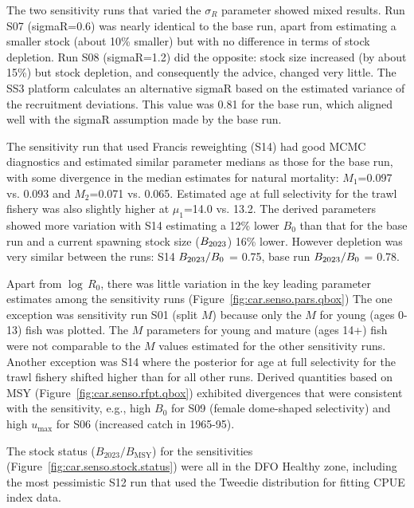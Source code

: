 \documentclass[11pt]{book}
\newcommand{\Bmsy}{B_\text{MSY}}
\newcommand{\pc}{\%}
\begin{document}
The two sensitivity runs that varied the $\sigma_R$ parameter showed mixed results.
Run S07 (sigmaR=0.6) was nearly identical to the base run, apart from estimating a smaller stock (about 10\pc{} smaller) but with no difference in terms of stock depletion.
Run S08 (sigmaR=1.2) did the opposite: stock size increased (by about 15\pc{}) but stock depletion, and consequently the advice, changed very little.
The SS3 platform calculates an alternative sigmaR based on the estimated variance of the recruitment deviations. 
This value was 0.81 for the base run, which aligned well with the sigmaR assumption made by the base run.

The sensitivity run that used Francis reweighting (S14) had good MCMC diagnostics and estimated similar parameter medians as those for the base run, with some divergence in the median estimates for natural mortality: $M_1$=0.097 vs. 0.093 and $M_2$=0.071 vs. 0.065. 
Estimated age at full selectivity for the trawl fishery was also slightly higher at $\mu_1$=14.0 vs. 13.2.
The derived parameters showed more variation with S14 estimating a 12\pc{} lower $B_0$ than that for the base run and a current spawning stock size ($B_{2023}$) 16\pc{} lower. 
However depletion was very similar between the runs: S14 $B_{2023}/B_0$ = 0.75, base run $B_{2023}/B_0$ = 0.78.

Apart from $\log\,R_0$, there was little variation in the key leading parameter estimates among the  sensitivity runs (Figure~\ref{fig:car.senso.pars.qbox})
The one exception was sensitivity run S01 (split $M$) because only the $M$ for young (ages 0-13) fish was plotted.
The $M$ parameters for young and mature (ages 14+) fish were not comparable to the $M$ values estimated for the other sensitivity runs.
Another exception was S14 where the posterior for age at full selectivity for the trawl fishery shifted higher than for all other runs. 
Derived quantities based on MSY (Figure~\ref{fig:car.senso.rfpt.qbox}) exhibited divergences that were consistent with the sensitivity, e.g., high $B_0$ for S09 (female dome-shaped selectivity) and high $u_\text{max}$ for S06 (increased catch in 1965-95).

The stock status ($B_{2023}/\Bmsy$) for the sensitivities (Figure~\ref{fig:car.senso.stock.status}) were all in the DFO Healthy zone, including the most pessimistic S12 run that used the Tweedie distribution for fitting CPUE index data.

\begin{landscapepage}{}{\LH}{\RH}{\LF}{\RF}
\end{landscapepage}
\end{document}
